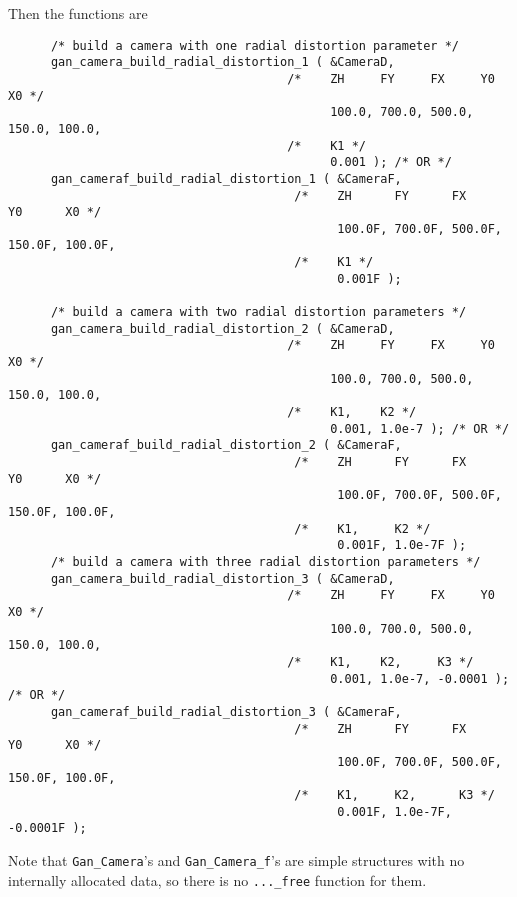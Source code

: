Then the functions are
\begin{verbatim}
      /* build a camera with one radial distortion parameter */
      gan_camera_build_radial_distortion_1 ( &CameraD,
                                       /*    ZH     FY     FX     Y0     X0 */
                                             100.0, 700.0, 500.0, 150.0, 100.0,
                                       /*    K1 */
                                             0.001 ); /* OR */
      gan_cameraf_build_radial_distortion_1 ( &CameraF,
                                        /*    ZH      FY      FX      Y0      X0 */
                                              100.0F, 700.0F, 500.0F, 150.0F, 100.0F,
                                        /*    K1 */
                                              0.001F );

      /* build a camera with two radial distortion parameters */
      gan_camera_build_radial_distortion_2 ( &CameraD,
                                       /*    ZH     FY     FX     Y0     X0 */
                                             100.0, 700.0, 500.0, 150.0, 100.0,
                                       /*    K1,    K2 */
                                             0.001, 1.0e-7 ); /* OR */
      gan_cameraf_build_radial_distortion_2 ( &CameraF,
                                        /*    ZH      FY      FX      Y0      X0 */
                                              100.0F, 700.0F, 500.0F, 150.0F, 100.0F,
                                        /*    K1,     K2 */
                                              0.001F, 1.0e-7F );
      /* build a camera with three radial distortion parameters */
      gan_camera_build_radial_distortion_3 ( &CameraD,
                                       /*    ZH     FY     FX     Y0     X0 */
                                             100.0, 700.0, 500.0, 150.0, 100.0,
                                       /*    K1,    K2,     K3 */
                                             0.001, 1.0e-7, -0.0001 ); /* OR */
      gan_cameraf_build_radial_distortion_3 ( &CameraF,
                                        /*    ZH      FY      FX      Y0      X0 */
                                              100.0F, 700.0F, 500.0F, 150.0F, 100.0F,
                                        /*    K1,     K2,      K3 */
                                              0.001F, 1.0e-7F, -0.0001F );
\end{verbatim}
Note that {\tt Gan\_Camera}'s and {\tt Gan\_Camera\_f}'s are simple structures
with no internally allocated data, so there is no {\tt ...\_free} function
for them.


